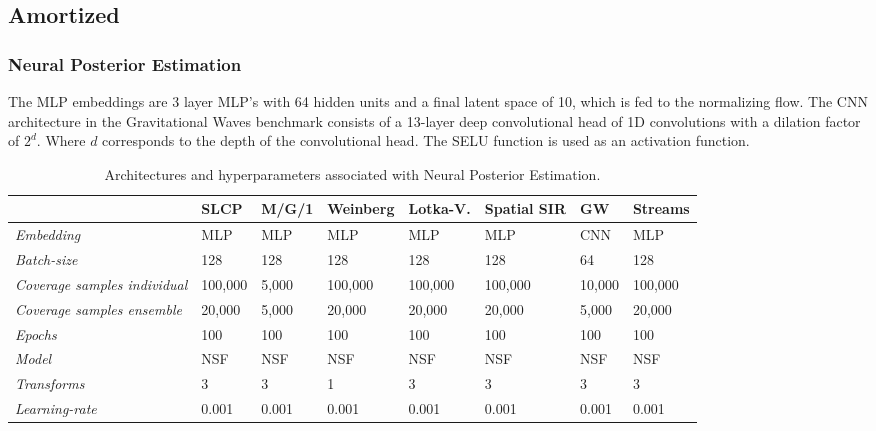 \documentclass[twoside]{article}
\begin{document}
\subsection{Amortized}
\subsubsection{Neural Posterior Estimation}
The MLP embeddings are 3 layer MLP's with 64 hidden units and a final latent space of 10, which is fed to the normalizing flow.
The CNN architecture in the Gravitational Waves benchmark consists of a 13-layer deep convolutional head of 1D convolutions with a dilation factor of $2^d$. Where $d$ corresponds to the depth of the convolutional head. The SELU \citep{selu} function is used as an activation function.
\begin{table}[h!]
    \centering
    \begin{tabular}{llllllll}
        \toprule
        & SLCP & M/G/1 & Weinberg & Lotka-V. & Spatial SIR & GW & Streams \\
        \midrule
        \emph{Embedding} & MLP & MLP & MLP & MLP & MLP & CNN & MLP \\ 
        \emph{Batch-size} & 128 & 128 & 128 & 128 & 128 & 64 & 128 \\
        \emph{Coverage samples individual} & 100,000 & 5,000 & 100,000 & 100,000 & 100,000 & 10,000 & 100,000 \\
        \emph{Coverage samples ensemble} & 20,000 & 5,000 & 20,000 & 20,000 & 20,000 & 5,000 & 20,000 \\
        \emph{Epochs} & 100 & 100 & 100 & 100 & 100 & 100 & 100 \\
        \emph{Model} & NSF & NSF & NSF & NSF & NSF & NSF & NSF \\
        \emph{Transforms} & 3 & 3 & 1 & 3 & 3 & 3 & 3 \\
        \emph{Learning-rate} & 0.001 & 0.001 & 0.001 & 0.001 & 0.001 & 0.001 & 0.001 \\
        \bottomrule
    \end{tabular}
    \caption{Architectures and hyperparameters associated with Neural Posterior Estimation.}
    \label{tab:npe_hyperparameters}
\end{table}
\end{document}
